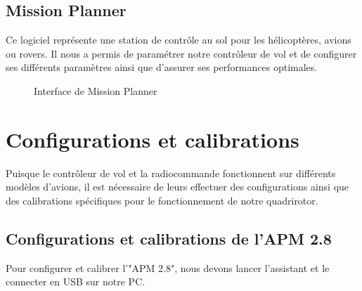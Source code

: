 	\subsection{Mission Planner	}
	Ce logiciel représente une station de contrôle au sol pour les hélicoptères, avions ou rovers. Il nous a permis de paramétrer notre contrôleur de vol et de configurer ses différents paramètres ainsi que d'assurer ses performances optimales.
	\begin{figure} [H]
		\begin{center}
			\centering
			\hspace*{1.5cm}
			\centering
			\hspace*{1.5cm}	\caption{Interface de Mission Planner}
		\end{center}
	\end{figure}
	\section{Configurations et calibrations}
	Puisque le contrôleur de vol et la radiocommande fonctionnent sur différents modèles d'avions, il est nécessaire de leurs effectuer des configurations  ainsi que  des calibrations spécifiques pour le fonctionnement de notre quadrirotor. 
	\subsection{Configurations et calibrations de l'APM 2.8}
	Pour configurer et calibrer l'"APM 2.8", nous devons lancer l'assistant et le connecter en USB sur notre PC.

